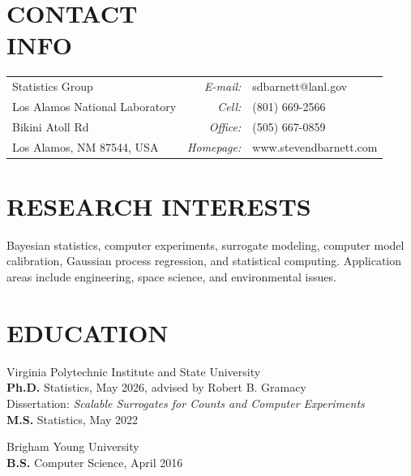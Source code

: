 \documentclass[margin,line]{res}
\begin{document}

\begin{resume}

\vspace{-0.1cm}
\section{\bf CONTACT\\INFO}
\vspace{.05in}
\begin{tabular}{@{}p{2.7in}rp{2in}}
Statistics Group  & {\it E-mail:} & sdbarnett@lanl.gov \\
Los Alamos National Laboratory & {\it Cell:} & (801) 669-2566 \\
Bikini Atoll Rd & {\it Office:} & (505) 667-0859 \\
Los Alamos, NM 87544, USA & {\it Homepage:} & www.stevendbarnett.com
\end{tabular}

\medskip
\section{\bf RESEARCH INTERESTS}
Bayesian statistics, computer experiments, surrogate modeling, computer model calibration, Gaussian process regression, and statistical computing. Application areas include engineering, space science, and environmental issues.

\section{\bf EDUCATION}
{\sc Virginia Polytechnic Institute and State University}\\
{\bf Ph.D.} Statistics, May 2026, advised by Robert B. Gramacy \\
Dissertation: \textit{Scalable Surrogates for Counts and Computer Experiments} \\
{\bf M.S.} Statistics, May 2022

{\sc Brigham Young University} \\
{\bf B.S.} Computer Science, April 2016


\end{resume}
\end{document}
